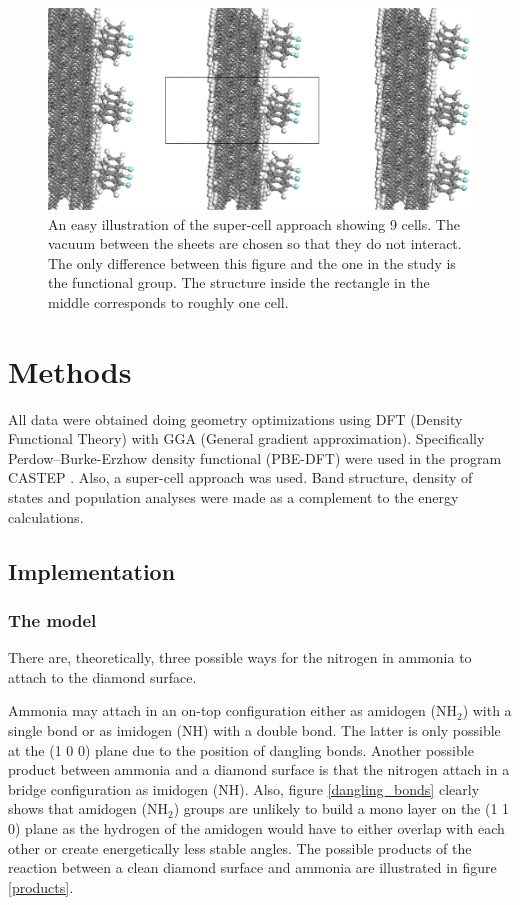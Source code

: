 \documentclass[10pt,a4paper]{article}
\begin{document}
\begin{figure} \captionsetup{width=.8\linewidth} \caption{An easy illustration of the super-cell approach showing 9 cells. The vacuum between the sheets are chosen so that they do not interact. The only difference between this figure and the one in the study is the functional group. The structure inside the rectangle in the middle corresponds to roughly one cell.} \label{supercell}
%
\includegraphics[width=.8\linewidth]{pictures/supercellvacuum.png}
\end{figure}

\section{Methods}
All data were obtained doing geometry optimizations using DFT (Density Functional Theory) with GGA (General gradient approximation). Specifically Perdow--Burke-Erzhow density functional (PBE-DFT) were used in the program CASTEP \cite{castep}. Also, a super-cell approach was used. Band structure, density of states and population analyses were made as a complement to the energy calculations. 

\subsection{Implementation}
\subsubsection{The model}
There are, theoretically, three possible ways for the nitrogen in ammonia to attach to the diamond surface.  

Ammonia may attach in an on-top configuration either as amidogen (NH$_2$) with a single bond or as imidogen (NH) with a double bond. The latter is only possible at the (1 0 0) plane due to the position of dangling bonds. Another possible product between ammonia and a diamond surface is that the nitrogen  attach in a bridge configuration as imidogen (NH).  Also, figure \ref{dangling_bonds}  clearly shows that amidogen (NH$_2$) groups are unlikely to build a mono layer on the (1 1 0) plane as the hydrogen of the amidogen would have to either overlap with each other or create energetically less stable angles. The possible products of the reaction between a clean diamond surface and ammonia are illustrated in figure \ref{products}.
\end{document}
